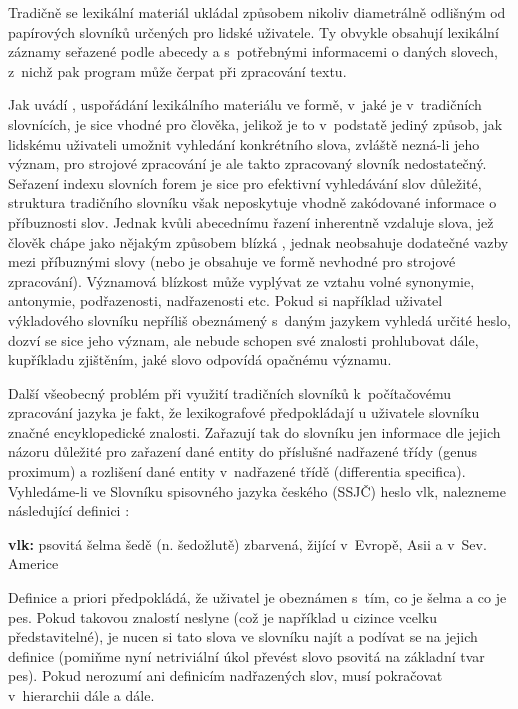 \documentclass[a4paper, 11pt, oneside, showtrims]{book}
\newcommand\ex{\textsf}
\begin{document}
				Tradičně se lexikální materiál ukládal způsobem nikoliv diametrálně odlišným od papírových slovníků určených pro lidské uživatele. Ty obvykle obsahují lexikální záznamy seřazené podle abecedy a s~potřebnými informacemi o daných slovech, z~nichž pak program může čerpat při zpracování textu.

				Jak uvádí \textcite{pala2013vceska}, uspořádání lexikálního materiálu ve formě, v~jaké je v~tradičních slovnících, je sice vhodné pro člověka, jelikož je to v~podstatě jediný způsob, jak lidskému uživateli umožnit vyhledání konkrétního slova, zvláště nezná-li jeho význam, pro strojové zpracování je ale takto zpracovaný slovník nedostatečný. Seřazení indexu slovních forem je sice pro efektivní vyhledávání slov důležité, struktura tradičního slovníku však neposkytuje vhodně zakódované informace o příbuznosti slov. Jednak kvůli abecednímu řazení inherentně vzdaluje slova, jež člověk chápe jako nějakým způsobem blízká \parencite{pala2013vceska}, jednak neobsahuje dodatečné vazby mezi příbuznými slovy (nebo je obsahuje ve formě nevhodné pro strojové zpracování). Významová blízkost může vyplývat ze vztahu volné synonymie, antonymie, podřazenosti, nadřazenosti etc. Pokud si například uživatel výkladového slovníku nepříliš obeznámený s~daným jazykem vyhledá určité heslo, dozví se sice jeho význam, ale nebude schopen své znalosti prohlubovat dále, kupříkladu zjištěním, jaké slovo odpovídá opačnému významu.

				Další všeobecný problém při využití tradičních slovníků k~počítačovému zpracování jazyka je fakt, že lexikografové předpokládají u uživatele slovníku značné encyklopedické znalosti. Zařazují tak do slovníku jen informace dle jejich názoru důležité pro zařazení dané entity do příslušné nadřazené třídy (genus proximum) a rozlišení dané entity v~nadřazené třídě (differentia specifica). Vyhledáme-li ve Slovníku spisovného jazyka českého (SSJČ) heslo \ex{vlk}, nalezneme následující definici \parencite{Havranek1989}:

				\bigskip
				{\noindent \ex{\textbf{vlk: } psovitá šelma šedě (n. šedožlutě) zbarvená, žijící v~Evropě, Asii a v~Sev. Americe}}
				\bigskip

				Definice a priori předpokládá, že uživatel je obeznámen s~tím, co je \ex{šelma} a co je \ex{pes}. Pokud takovou znalostí neslyne (což je například u cizince vcelku představitelné), je nucen si tato slova ve slovníku najít a podívat se na jejich definice (pomiňme nyní netriviální úkol převést slovo \ex{psovitá} na základní tvar \ex{pes}). Pokud nerozumí ani definicím nadřazených slov, musí pokračovat v~hierarchii dále a dále. 
\end{document}
